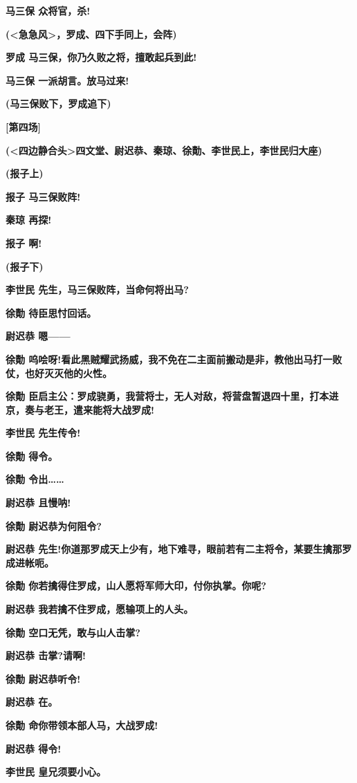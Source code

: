 \textbf{马三保 众将官，杀!}

\textbf{(\textless{}急急风\textgreater{}，罗成、四下手同上，会阵)}

\textbf{罗成 马三保，你乃久败之将，擅敢起兵到此!}

\textbf{马三保 一派胡言。放马过来!}

\textbf{(马三保败下，罗成追下)}

\textbf{{[}第四场{]}}

\textbf{(\textless{}四边静合头\textgreater{}四文堂、尉迟恭、秦琼、徐勣、李世民上，李世民归大座)}

\textbf{(报子上)}

\textbf{报子 马三保败阵!}

\textbf{秦琼 再探!}

\textbf{报子 啊!}

\textbf{(报子下)}

\textbf{李世民 先生，马三保败阵，当命何将出马?}

\textbf{徐勣 待臣思忖回话。}

\textbf{尉迟恭 嗯------}

\textbf{徐勣
呜哙呀!看此黑贼耀武扬威，我不免在二主面前搬动是非，教他出马打一败仗，也好灭灭他的火性。}

\textbf{徐勣
臣启主公：罗成骁勇，我营将士，无人对敌，将营盘暂退四十里，打本进京，奏与老王，遣来能将大战罗成!}

\textbf{李世民 先生传令!}

\textbf{徐勣 得令。}

\textbf{徐勣 令出\ldots{}\ldots{}}

\textbf{尉迟恭 且慢呐!}

\textbf{徐勣 尉迟恭为何阻令?}

\textbf{尉迟恭
先生!你道那罗成天上少有，地下难寻，眼前若有二主将令，某要生擒那罗成进帐呃。}

\textbf{徐勣 你若擒得住罗成，山人愿将军师大印，付你执掌。你呢?}

\textbf{尉迟恭 我若擒不住罗成，愿输项上的人头。}

\textbf{徐勣 空口无凭，敢与山人击掌?}

\textbf{尉迟恭 击掌?请啊!}

\textbf{徐勣 尉迟恭听令!}

\textbf{尉迟恭 在。}

\textbf{徐勣 命你带领本部人马，大战罗成!}

\textbf{尉迟恭 得令!}

\textbf{李世民 皇兄须要小心。}

